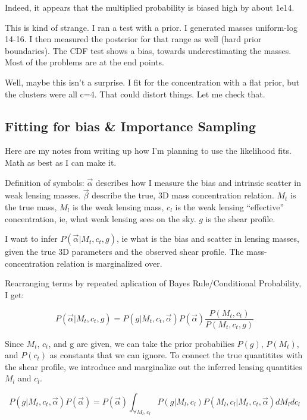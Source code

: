 \documentclass[11pt]{article}
\begin{document}
Indeed, it appears that the multiplied probability is biased high by about 1e14. 

This is kind of strange. I ran a test with a prior. I generated masses uniform-log 14-16. I then measured the posterior for that range as well (hard prior boundaries). The CDF test shows a bias, towards underestimating the masses. Most of the problems are at the end points. 

Well, maybe this isn't a surprise. I fit for the concentration with a flat prior, but the clusters were all c=4. That could distort things. Let me check that.


\subsection{Fitting for bias \& Importance Sampling}
\label{sec:bias_framework}

Here are my notes from writing up how I'm planning to use the likelihood fits. Math as best as I can make it.

Definition of symbols: $\vec\alpha$ describes how I measure the bias and intrinsic scatter in weak lensing masses. $\vec\beta$ describe the true, 3D mass concentration relation. $M_t$ is the true mass, $M_l$ is the weak lensing mass, $c_l$ is the weak lensing ``effective'' concentration, ie, what weak lensing sees on the sky. $g$ is the shear profile.

I want to infer $P(\vec\alpha|M_t, c_t, g)$, ie what is the bias and scatter in lensing masses, given the true 3D parameters and the observed shear profile. The mass-concentration relation is marginalized over.

Rearranging terms by repeated aplication of Bayes Rule/Conditional Probability, I get:

\begin{equation}
P(\vec\alpha|M_t, c_t, g) = P(g|M_t,c_t,\vec\alpha)P(\vec\alpha)\frac{P(M_t,c_t)}{P(M_t,c_t,g)}
\end{equation}

Since $M_t$, $c_t$, and g are given, we can take the prior probabilies $P(g)$, $P(M_t)$, and $P(c_t)$ as constants that we can ignore. To connect the true quantitites with the shear profile, we introduce and marginalize out the inferred lensing quantities $M_l$ and $c_l$.

\begin{equation}
P(g|M_t,c_t,\vec\alpha)P(\vec\alpha) = P(\vec\alpha)\int_{\forall M_l, c_l} P(g|M_l,c_l)P(M_l,c_l|M_t,c_t,\vec\alpha)dM_ldc_l
\label{eq:marginalization}
\end{equation}
\end{document}
